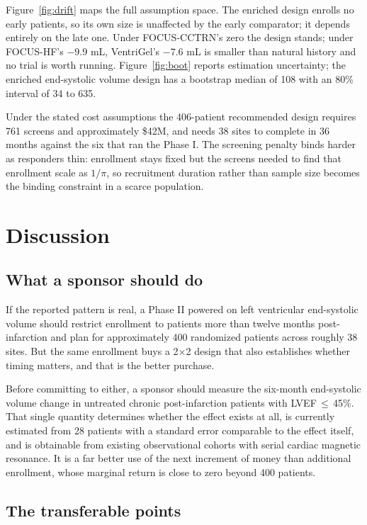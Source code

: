 \documentclass[10pt,twocolumn,letterpaper]{article}
\begin{document}
Figure~\ref{fig:drift} maps the full assumption space. The enriched design enrolls no early patients,
so its own size is unaffected by the early comparator; it depends entirely on the late one. Under
FOCUS-CCTRN's zero the design stands; under FOCUS-HF's $-9.9$ mL, VentriGel's $-7.6$ mL is smaller
than natural history and no trial is worth running. Figure~\ref{fig:boot} reports estimation
uncertainty; the enriched end-systolic volume design has a bootstrap median of 108 with an 80\%
interval of 34 to 635.

Under the stated cost assumptions the 406-patient recommended design requires 761 screens and
approximately \$42M, and needs 38 sites to complete in 36 months against the six that ran the Phase I.
The screening penalty binds harder as responders thin: enrollment stays fixed but the screens needed
to find that enrollment scale as $1/\pi$, so recruitment duration rather than sample size becomes the
binding constraint in a scarce population.


\section{Discussion}

\subsection{What a sponsor should do}

If the reported pattern is real, a Phase II powered on left ventricular end-systolic volume should
restrict enrollment to patients more than twelve months post-infarction and plan for approximately
400 randomized patients across roughly 38 sites. But the same enrollment buys a 2$\times$2 design
that also establishes whether timing matters, and that is the better purchase.

Before committing to either, a sponsor should measure the six-month end-systolic volume change in
untreated chronic post-infarction patients with LVEF\,$\leq$\,45\%. That single quantity determines
whether the effect exists at all, is currently estimated from 28 patients with a standard error
comparable to the effect itself, and is obtainable from existing observational cohorts with serial
cardiac magnetic resonance. It is a far better use of the next increment of money than additional
enrollment, whose marginal return is close to zero beyond 400 patients.

\subsection{The transferable points}
\end{document}
